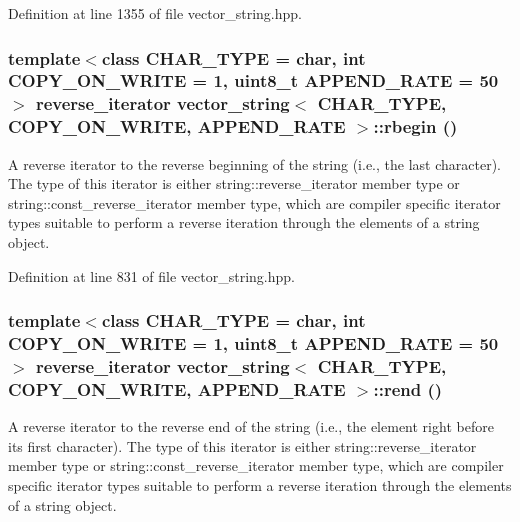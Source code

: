 Definition at line 1355 of file vector\_\-string.hpp.\hypertarget{classvector__string_8fc790b60af4ce060a8bfc9429d3ede2}{
\subsubsection[{rbegin}]{\setlength{\rightskip}{0pt plus 5cm}template$<$class CHAR\_\-TYPE  = char, int COPY\_\-ON\_\-WRITE = 1, uint8\_\-t APPEND\_\-RATE = 50$>$ reverse\_\-iterator {\bf vector\_\-string}$<$ CHAR\_\-TYPE, COPY\_\-ON\_\-WRITE, APPEND\_\-RATE $>$::rbegin ()}}
\label{classvector__string_8fc790b60af4ce060a8bfc9429d3ede2}


A reverse iterator to the reverse beginning of the string (i.e., the last character). The type of this iterator is either string::reverse\_\-iterator member type or string::const\_\-reverse\_\-iterator member type, which are compiler specific iterator types suitable to perform a reverse iteration through the elements of a string object. 

Definition at line 831 of file vector\_\-string.hpp.\hypertarget{classvector__string_d4bd42b7a1799784b864bb0d1a143453}{
\subsubsection[{rend}]{\setlength{\rightskip}{0pt plus 5cm}template$<$class CHAR\_\-TYPE  = char, int COPY\_\-ON\_\-WRITE = 1, uint8\_\-t APPEND\_\-RATE = 50$>$ reverse\_\-iterator {\bf vector\_\-string}$<$ CHAR\_\-TYPE, COPY\_\-ON\_\-WRITE, APPEND\_\-RATE $>$::rend ()}}
\label{classvector__string_d4bd42b7a1799784b864bb0d1a143453}


A reverse iterator to the reverse end of the string (i.e., the element right before its first character). The type of this iterator is either string::reverse\_\-iterator member type or string::const\_\-reverse\_\-iterator member type, which are compiler specific iterator types suitable to perform a reverse iteration through the elements of a string object. 

